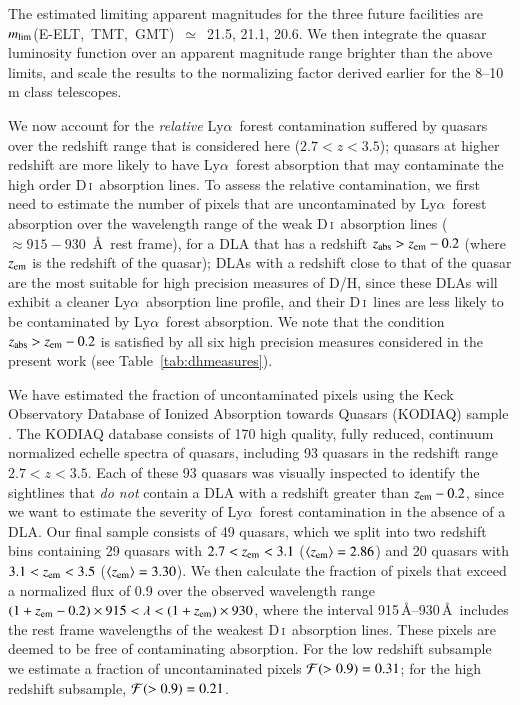 \documentclass[12pt,preprint,useAMS,usenatbib]{emulateapj}
\newcommand{\DI}{\textrm{D}\,\textsc{i}}
\newcommand{\Lya}{Ly$\alpha$}
\begin{document}
\begin{appendix}
The estimated limiting apparent magnitudes for the three future facilities are
$m_{\rm lim}$(E-ELT,~TMT,~GMT)~$\simeq$~21.5, 21.1, 20.6.
We then integrate the \citet{Ros13} quasar luminosity function
over an apparent magnitude range brighter than the above
limits, and scale the results to the normalizing factor derived earlier
for the 8--10\,m class telescopes.

We now account for the \emph{relative} \Lya\ forest
contamination suffered by quasars over the redshift range
that is considered here ($2.7 < z < 3.5$); quasars at higher
redshift are more likely to have \Lya\ forest absorption
that may contaminate the high order \DI\ absorption lines.
To assess the relative contamination, we first need to
estimate the number of pixels that are uncontaminated
by \Lya\ forest absorption over the wavelength range of
the weak \DI\ absorption lines ($\approx915-930$~\AA\ rest frame),
for a DLA that has a redshift $z_{\rm abs} > z_{\rm em} - 0.2$
(where $z_{\rm em}$ is the redshift of the quasar); DLAs with
a redshift close to that of the quasar are the most suitable for
high precision measures of D/H, since these DLAs will exhibit
a cleaner \Lya\ absorption line profile, and their \DI\ lines are
less likely to be contaminated by \Lya\ forest absorption.
We note that the condition $z_{\rm abs} > z_{\rm em} - 0.2$
is satisfied by all six high precision measures considered in
the present work (see Table~\ref{tab:dhmeasures}).

We have estimated the fraction of uncontaminated pixels
using the Keck Observatory Database
of Ionized Absorption towards Quasars (KODIAQ)
sample \citep{Ome15}.
The KODIAQ database consists of 170 high quality, fully
reduced, continuum normalized echelle spectra of quasars,
including 93 quasars in the redshift range $2.7 < z < 3.5$.
Each of these 93 quasars was visually inspected to identify
the sightlines that \emph{do not} contain a DLA with a redshift
greater than $z_{\rm em}-0.2$, since we want to estimate the
severity of \Lya\ forest contamination in the absence of a DLA.
Our final sample consists of 49 quasars, which we split
into two redshift bins containing
29 quasars with $2.7<z_{\rm em}<3.1$ ($\langle z_{\rm em}\rangle = 2.86$) and
20 quasars with $3.1<z_{\rm em}<3.5$ ($\langle z_{\rm em}\rangle = 3.30$).
We then calculate the fraction of pixels that exceed a
normalized flux of 0.9 over the observed wavelength range
$(1+z_{\rm em}-0.2)\times915 < \lambda < (1+z_{\rm em})\times930$,
where the interval 915\,\AA--930\,\AA\ includes the rest frame wavelengths
of the weakest \DI\ absorption lines.
These pixels are deemed to be free of contaminating absorption.
For the low redshift subsample we estimate a fraction of
uncontaminated pixels ${\cal F}(>0.9)=0.31$; for the
high redshift subsample, ${\cal F}(>0.9)=0.21$.


\end{appendix}
\end{document}
